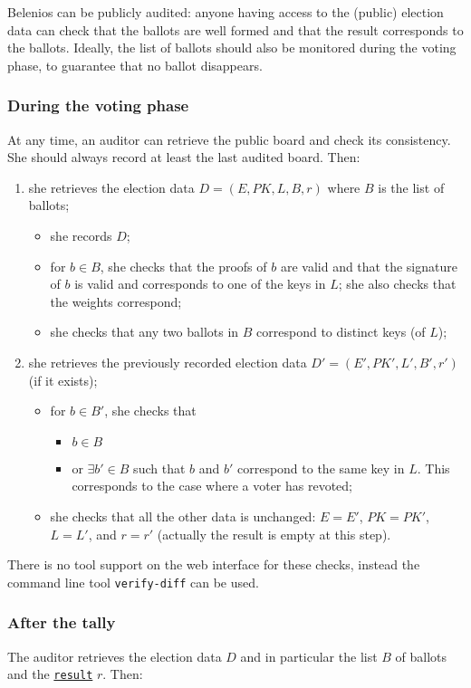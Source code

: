 \documentclass[a4paper]{article}
\newcommand{\result}{\texttt{result}}
\begin{document}
Belenios can be publicly audited: anyone having access to the (public)
election data can check that the ballots are well formed and that the
result corresponds to the ballots. Ideally, the list of ballots should
also be monitored during the voting phase, to guarantee that no ballot
disappears.

\subsubsection{During the voting phase}
\label{sec:audit-voting}
At any time, an auditor can retrieve the public board and check its consistency. She should
always record at least the last audited board. Then:
\begin{enumerate}
\item she retrieves the election data $D = (E,PK,L,B,r)$ where $B$ is the list of ballots;
  \begin{itemize}
  \item she records $D$;
  \item for $b\in B$, she checks that the proofs of $b$ are valid and that
  the signature of $b$ is valid and corresponds to one of the keys in
  $L$; she also checks that the weights correspond;
  \item she checks that any two ballots in $B$ correspond to distinct keys (of
    $L$);
  \end{itemize}
\item she retrieves the previously recorded election data $D' = (E',PK',L',B',r')$ (if it
  exists);
  \begin{itemize}
  \item for $b\in B'$, she checks that
    \begin{itemize}
    \item $b\in B$
    \item or $\exists b'\in B$ such that $b$ and $b'$ correspond to
      the same key in $L$. This corresponds to the case where a voter
      has revoted;
    \end{itemize}
    \item she checks that all the other data is unchanged: $E=E'$, $PK=PK'$, $L=L'$,
      and $r=r'$ (actually the result is empty at this step).
\end{itemize}
\end{enumerate}

There is no tool support on the web interface for these checks,
instead the command line tool \texttt{verify-diff} can be used.

\subsubsection{After the tally}
The auditor retrieves the election data $D$ and in
  particular the list $B$ of ballots and the
  \hyperref[election-result]{\result} $r$. Then:
\end{document}
